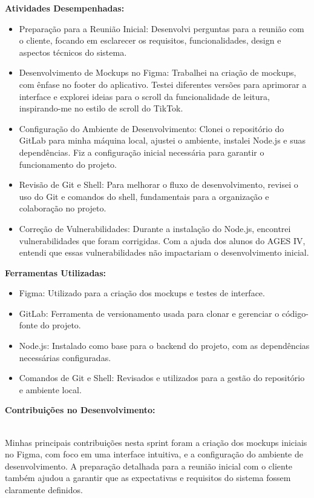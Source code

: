 \textbf{Atividades Desempenhadas:}

\begin{itemize}
\item
  Preparação para a Reunião Inicial: Desenvolvi perguntas para a reunião
  com o cliente, focando em esclarecer os requisitos, funcionalidades,
  design e aspectos técnicos do sistema.
\item
  Desenvolvimento de Mockups no Figma: Trabalhei na criação de mockups,
  com ênfase no footer do aplicativo. Testei diferentes versões para
  aprimorar a interface e explorei ideias para o scroll da
  funcionalidade de leitura, inspirando-me no estilo de scroll do
  TikTok.
\item
  Configuração do Ambiente de Desenvolvimento: Clonei o repositório do
  GitLab para minha máquina local, ajustei o ambiente, instalei Node.js
  e suas dependências. Fiz a configuração inicial necessária para
  garantir o funcionamento do projeto.
\item
  Revisão de Git e Shell: Para melhorar o fluxo de desenvolvimento,
  revisei o uso do Git e comandos do shell, fundamentais para a
  organização e colaboração no projeto.
\item
  Correção de Vulnerabilidades: Durante a instalação do Node.js,
  encontrei vulnerabilidades que foram corrigidas. Com a ajuda dos
  alunos do AGES IV, entendi que essas vulnerabilidades não impactariam
  o desenvolvimento inicial.
\end{itemize}

\textbf{Ferramentas Utilizadas:}

\begin{itemize}
\item
  Figma: Utilizado para a criação dos mockups e testes de interface.
\item
  GitLab: Ferramenta de versionamento usada para clonar e gerenciar o
  código-fonte do projeto.
\item
  Node.js: Instalado como base para o backend do projeto, com as
  dependências necessárias configuradas.
\item
  Comandos de Git e Shell: Revisados e utilizados para a gestão do
  repositório e ambiente local.
\end{itemize}

\textbf{Contribuições no Desenvolvimento:\\
}\strut \\
Minhas principais contribuições nesta sprint foram a criação dos mockups
iniciais no Figma, com foco em uma interface intuitiva, e a configuração
do ambiente de desenvolvimento. A preparação detalhada para a reunião
inicial com o cliente também ajudou a garantir que as expectativas e
requisitos do sistema fossem claramente definidos.

